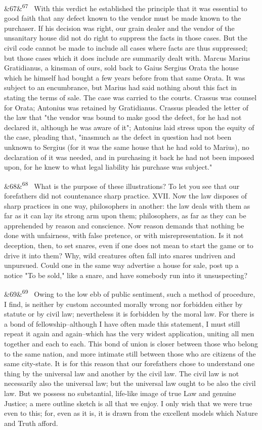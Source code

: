 \documentclass[12pt]{article}
\newcommand{\para}[1][]{\par\noindent\ifx&#1&\else\textsuperscript{\footnotesize #1}~\fi}
\begin{document}
\para[67] With this verdict he established the principle that it was essential to good faith that any defect known to the vendor must be made known to the purchaser. If his decision was right, our grain dealer and the vendor of the unsanitary house did not do right to suppress the facts in those cases. But the civil code cannot be made to include all cases where facts are thus suppressed; but those cases which it does include are summarily dealt with. Marcus Marius Gratidianus, a kinsman of ours, sold back to Gaius Sergius Orata the house which he himself had bought a few years before from that same Orata. It was subject to an encumbrance, but Marius had said nothing about this fact in stating the terms of sale. The case was carried to the courts. Crassus was counsel for Orata; Antonius was retained by Gratidianus. Crassus pleaded the letter of the law that "the vendor was bound to make good the defect, for he had not declared it, although he was aware of it"; Antonius laid stress upon the equity of the case, pleading that, "inasmuch as the defect in question had not been unknown to Sergius (for it was the same house that he had sold to Marius), no declaration of it was needed, and in purchasing it back he had not been imposed upon, for he knew to what legal liability his purchase was subject."

\para[68] What is the purpose of these illustrations? To let you see that our forefathers did not countenance sharp practice. XVII. Now the law disposes of sharp practices in one way, philosophers in another: the law deals with them as far as it can lay its strong arm upon them; philosophers, as far as they can be apprehended by reason and conscience. Now reason demands that nothing be done with unfairness, with false pretence, or with misrepresentation. Is it not deception, then, to set snares, even if one does not mean to start the game or to drive it into them? Why, wild creatures often fall into snares undriven and unpursued. Could one in the same way advertise a house for sale, post up a notice "To be sold," like a snare, and have somebody run into it unsuspecting?

\para[69] Owing to the low ebb of public sentiment, such a method of procedure, I find, is neither by custom accounted morally wrong nor forbidden either by statute or by civil law; nevertheless it is forbidden by the moral law. For there is a bond of fellowship--although I have often made this statement, I must still repeat it again and again--which has the very widest application, uniting all men together and each to each. This bond of union is closer between those who belong to the same nation, and more intimate still between those who are citizens of the same city-state. It is for this reason that our forefathers chose to understand one thing by the universal law and another by the civil law. The civil law is not necessarily also the universal law; but the universal law ought to be also the civil law. But we possess no substantial, life-like image of true Law and genuine Justice; a mere outline sketch is all that we enjoy. I only wish that we were true even to this; for, even as it is, it is drawn from the excellent models which Nature and Truth afford.
\end{document}
